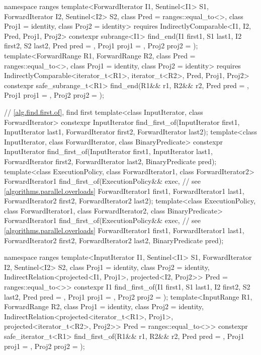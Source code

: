 \begin{codeblock}
{  namespace ranges {
    template<ForwardIterator I1, Sentinel<I1> S1, ForwardIterator I2, Sentinel<I2> S2,
        class Pred = ranges::equal_to<>, class Proj1 = identity, class Proj2 = identity>
      requires IndirectlyComparable<I1, I2, Pred, Proj1, Proj2>
      constexpr subrange<I1>
        find_end(I1 first1, S1 last1, I2 first2, S2 last2, Pred pred = {},
                 Proj1 proj1 = {}, Proj2 proj2 = {});
    template<ForwardRange R1, ForwardRange R2,
        class Pred = ranges::equal_to<>, class Proj1 = identity, class Proj2 = identity>
      requires IndirectlyComparable<iterator_t<R1>, iterator_t<R2>, Pred, Proj1, Proj2>
      constexpr safe_subrange_t<R1>
        find_end(R1&& r1, R2&& r2, Pred pred = {},
                 Proj1 proj1 = {}, Proj2 proj2 = {});
  }

  // \ref{alg.find.first.of}, find first
  template<class InputIterator, class ForwardIterator>
    constexpr InputIterator
      find_first_of(InputIterator first1, InputIterator last1,
                    ForwardIterator first2, ForwardIterator last2);
  template<class InputIterator, class ForwardIterator, class BinaryPredicate>
    constexpr InputIterator
      find_first_of(InputIterator first1, InputIterator last1,
                    ForwardIterator first2, ForwardIterator last2,
                    BinaryPredicate pred);
  template<class ExecutionPolicy, class ForwardIterator1, class ForwardIterator2>
    ForwardIterator1
      find_first_of(ExecutionPolicy&& exec, // see \ref{algorithms.parallel.overloads}
                    ForwardIterator1 first1, ForwardIterator1 last1,
                    ForwardIterator2 first2, ForwardIterator2 last2);
  template<class ExecutionPolicy, class ForwardIterator1,
           class ForwardIterator2, class BinaryPredicate>
    ForwardIterator1
      find_first_of(ExecutionPolicy&& exec, // see \ref{algorithms.parallel.overloads}
                    ForwardIterator1 first1, ForwardIterator1 last1,
                    ForwardIterator2 first2, ForwardIterator2 last2,
                    BinaryPredicate pred);

  namespace ranges {
    template<InputIterator I1, Sentinel<I1> S1, ForwardIterator I2, Sentinel<I2> S2,
        class Proj1 = identity, class Proj2 = identity,
        IndirectRelation<projected<I1, Proj1>, projected<I2, Proj2>> Pred = ranges::equal_to<>>
      constexpr I1 find_first_of(I1 first1, S1 last1, I2 first2, S2 last2,
                                 Pred pred = {},
                                 Proj1 proj1 = {}, Proj2 proj2 = {});
    template<InputRange R1, ForwardRange R2, class Proj1 = identity,
        class Proj2 = identity,
        IndirectRelation<projected<iterator_t<R1>, Proj1>,
          projected<iterator_t<R2>, Proj2>> Pred = ranges::equal_to<>>
      constexpr safe_iterator_t<R1>
        find_first_of(R1&& r1, R2&& r2,
                      Pred pred = {},
                      Proj1 proj1 = {}, Proj2 proj2 = {});
  }

}
\end{codeblock}
